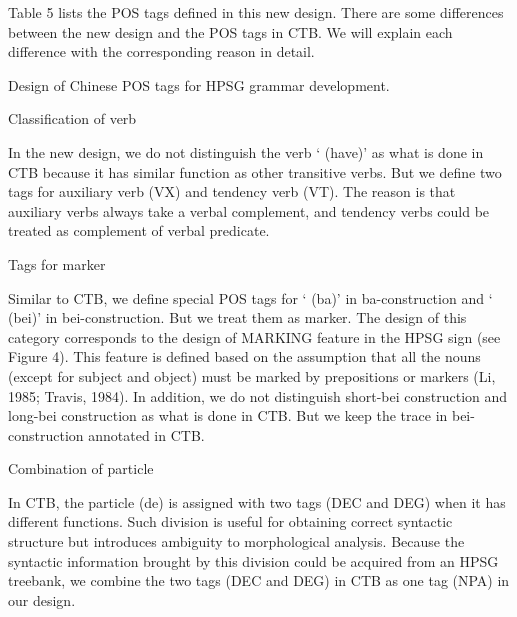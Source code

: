 \documentclass[english]{jnlp_1.4}
\renewcommand{\subsubsection}{}
\begin{document}
Table 5 lists the POS tags defined in this new design. There are some 
differences between the new design and the POS tags in CTB. We will explain 
each difference with the corresponding reason in detail.

\begin{table}[t]
\caption{Design of Chinese POS tags for HPSG grammar development.}

\end{table}



\subsubsection{Classification of verb}

In the new design, we do not distinguish the verb ` (have)' as what 
is done in CTB because it has similar function as other transitive verbs. 
But we define two tags for auxiliary verb (VX) and tendency verb (VT). The 
reason is that auxiliary verbs always take a verbal complement, and tendency 
verbs could be treated as complement of verbal predicate.

\subsubsection{Tags for marker}

Similar to CTB, we define special POS tags for ` (ba)' in 
ba-construction and ` (bei)' in bei-construction. But we treat 
them as marker. The design of this category corresponds to the design of 
MARKING feature in the HPSG sign (see Figure 4). This feature is defined 
based on the assumption that all the nouns (except for subject and object) 
must be marked by prepositions or markers (Li, 1985; Travis, 1984). In 
addition, we do not distinguish short-bei construction and long-bei 
construction as what is done in CTB. But we keep the trace in 
bei-construction annotated in CTB.


\subsubsection{Combination of particle}

In CTB, the particle  (de) is assigned with two tags (DEC and DEG) 
when it has different functions. Such division is useful for obtaining 
correct syntactic structure but introduces ambiguity to morphological 
analysis. Because the syntactic information brought by this division could 
be acquired from an HPSG treebank, we combine the two tags (DEC and DEG) in 
CTB as one tag (NPA) in our design.
\end{document}
